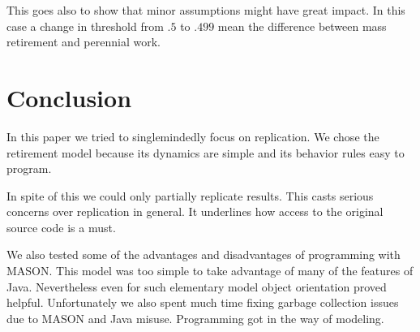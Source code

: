 \documentclass[runningheads,a4paper]{article}
\begin{document}
This goes also to show that minor assumptions might have great impact.
In this case a change in threshold from $.5$ to $.499$ mean the difference between mass retirement and perennial work.

\section{Conclusion}

In this paper we tried to singlemindedly focus on replication.
We chose the retirement model because its dynamics are simple and its behavior rules easy to program.

In spite of this we could only partially replicate results.
This casts serious concerns over replication in general.
It underlines how access to the original source code is a must.

We also tested some of the advantages and disadvantages of programming with MASON.
This model was too simple to take advantage of many of the features of Java.
Nevertheless even for such elementary model object orientation proved helpful.
Unfortunately we also spent much time fixing garbage collection issues due to MASON and Java misuse.
Programming got in the way of modeling.








\end{document}
